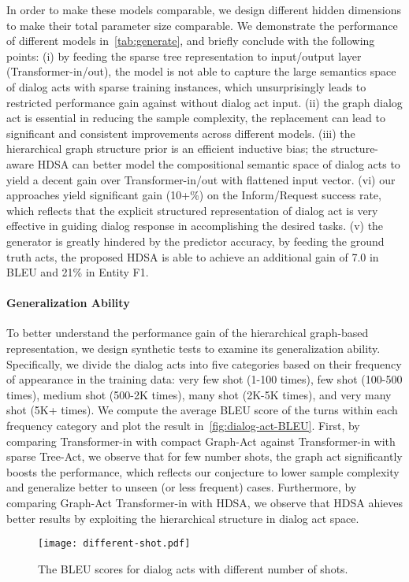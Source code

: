 \documentclass[11pt,a4paper]{article}
\begin{document}
In order to make these models comparable, we design different hidden dimensions to make their total parameter size comparable. We demonstrate the performance of different models in~\autoref{tab:generate}, and briefly conclude with the following points: (i) by feeding the sparse tree representation to input/output layer (Transformer-in/out), the model is not able to capture the large semantics space of dialog acts with sparse training instances, which unsurprisingly leads to restricted performance gain against without dialog act input. (ii) the graph dialog act is essential in reducing the sample complexity, the replacement can lead to significant and consistent improvements across different models. (iii) the hierarchical graph structure prior is an efficient inductive bias; the structure-aware HDSA can better model the compositional semantic space of dialog acts to yield a decent gain over Transformer-in/out with flattened input vector. (vi) our approaches yield significant gain (10+\%) on the Inform/Request success rate, which reflects that the explicit structured representation of dialog act is very effective in guiding dialog response in accomplishing the desired tasks. (v) the generator is greatly hindered by the predictor accuracy, by feeding the ground truth acts, the proposed HDSA is able to achieve an additional gain of 7.0 in BLEU and 21\% in Entity F1.
\paragraph{Generalization Ability}
To better understand the performance gain of the hierarchical graph-based representation, we design synthetic tests to examine its generalization ability.  Specifically, we divide the dialog acts into five categories based on their frequency of appearance in the training data: very few shot (1-100 times), few shot (100-500 times), medium shot (500-2K times), many shot (2K-5K times), and very many shot (5K+ times). We compute the average BLEU score of the turns within each frequency category and plot the result in~\autoref{fig:dialog-act-BLEU}. First, by comparing Transformer-in with compact Graph-Act against Transformer-in with sparse Tree-Act, we observe that for few number shots, the graph act significantly boosts the performance, which reflects our conjecture to lower sample complexity and generalize better to unseen (or less frequent) cases. Furthermore, by comparing Graph-Act Transformer-in with HDSA, we observe that HDSA ahieves better results by exploiting the hierarchical structure in dialog act space.
\begin{figure}[thb]
    \begin{center}
    \texttt{[image: different-shot.pdf]}
    \end{center}
    \caption{The BLEU scores for dialog acts with different number of shots. }
    \label{fig:dialog-act-BLEU}
\end{figure}
\end{document}

